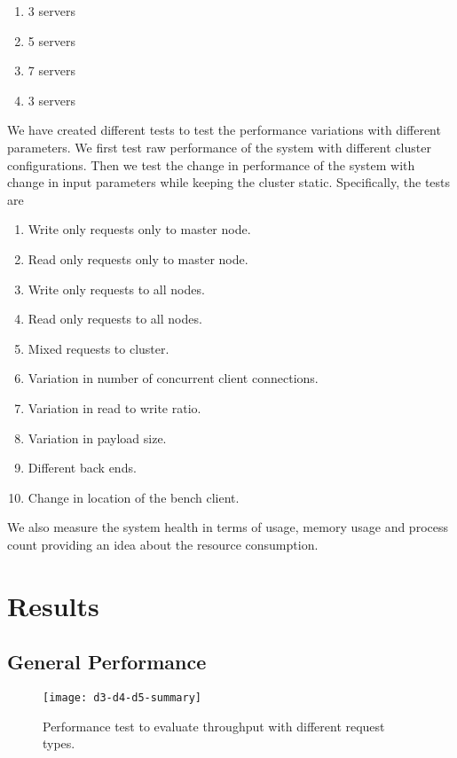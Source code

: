 \begin{enumerate}
  \item 3  servers
  \item 5  servers
  \item 7  servers
  \item 3  servers
\end{enumerate}

We have created different tests to test the performance variations with
different parameters. We first test raw performance of the system with
different cluster configurations. Then we test the change in performance
of the system with change in input parameters while keeping the cluster
static. Specifically, the tests are

\begin{enumerate}
  \item Write only requests only to master node.
  \item Read only requests only to master node.
  \item Write only requests to all nodes.
  \item Read only requests to all nodes.
  \item Mixed requests to cluster.
  \item Variation in number of concurrent client connections.
  \item Variation in read to write ratio.
  \item Variation in payload size.
  \item Different back ends.
  \item Change in location of the bench client.
\end{enumerate}

We also measure the system health in terms of  usage, memory usage and
process count providing an idea about the resource consumption.

\section{Results}

\subsection{General Performance}

\begin{figure}
  \begin{whole}
    \texttt{[image: d3-d4-d5-summary]}
    \caption[General Performance Throughput Test]{%
      Performance test to evaluate throughput with different request
    types.}
    \label{figure:res.general.performance}
  \end{whole}
\end{figure}

